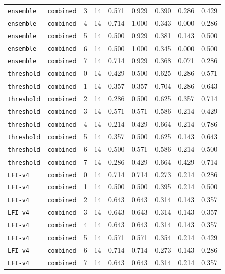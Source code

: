\documentclass{article}
\begin{document}
\begin{center}
{\begin{tabular}{llllccccc}
\texttt{ensemble} & \texttt{combined} & 3 & 14 & 0.571 & 0.929 & 0.390 & 0.286 & 0.429 \\
\texttt{ensemble} & \texttt{combined} & 4 & 14 & 0.714 & 1.000 & 0.343 & 0.000 & 0.286 \\
\texttt{ensemble} & \texttt{combined} & 5 & 14 & 0.500 & 0.929 & 0.381 & 0.143 & 0.500 \\
\texttt{ensemble} & \texttt{combined} & 6 & 14 & 0.500 & 1.000 & 0.345 & 0.000 & 0.500 \\
\texttt{ensemble} & \texttt{combined} & 7 & 14 & 0.714 & 0.929 & 0.368 & 0.071 & 0.286 \\
\texttt{threshold} & \texttt{combined} & 0 & 14 & 0.429 & 0.500 & 0.625 & 0.286 & 0.571 \\
\texttt{threshold} & \texttt{combined} & 1 & 14 & 0.357 & 0.357 & 0.704 & 0.286 & 0.643 \\
\texttt{threshold} & \texttt{combined} & 2 & 14 & 0.286 & 0.500 & 0.625 & 0.357 & 0.714 \\
\texttt{threshold} & \texttt{combined} & 3 & 14 & 0.571 & 0.571 & 0.586 & 0.214 & 0.429 \\
\texttt{threshold} & \texttt{combined} & 4 & 14 & 0.214 & 0.429 & 0.664 & 0.214 & 0.786 \\
\texttt{threshold} & \texttt{combined} & 5 & 14 & 0.357 & 0.500 & 0.625 & 0.143 & 0.643 \\
\texttt{threshold} & \texttt{combined} & 6 & 14 & 0.500 & 0.571 & 0.586 & 0.214 & 0.500 \\
\texttt{threshold} & \texttt{combined} & 7 & 14 & 0.286 & 0.429 & 0.664 & 0.429 & 0.714 \\
\texttt{LFI-v4} & \texttt{combined} & 0 & 14 & 0.714 & 0.714 & 0.273 & 0.214 & 0.286 \\
\texttt{LFI-v4} & \texttt{combined} & 1 & 14 & 0.500 & 0.500 & 0.395 & 0.214 & 0.500 \\
\texttt{LFI-v4} & \texttt{combined} & 2 & 14 & 0.643 & 0.643 & 0.314 & 0.143 & 0.357 \\
\texttt{LFI-v4} & \texttt{combined} & 3 & 14 & 0.643 & 0.643 & 0.314 & 0.143 & 0.357 \\
\texttt{LFI-v4} & \texttt{combined} & 4 & 14 & 0.643 & 0.643 & 0.314 & 0.143 & 0.357 \\
\texttt{LFI-v4} & \texttt{combined} & 5 & 14 & 0.571 & 0.571 & 0.354 & 0.214 & 0.429 \\
\texttt{LFI-v4} & \texttt{combined} & 6 & 14 & 0.714 & 0.714 & 0.273 & 0.143 & 0.286 \\
\texttt{LFI-v4} & \texttt{combined} & 7 & 14 & 0.643 & 0.643 & 0.314 & 0.214 & 0.357 \\
\bottomrule
\end{tabular}%
}
\end{center}
\end{document}
